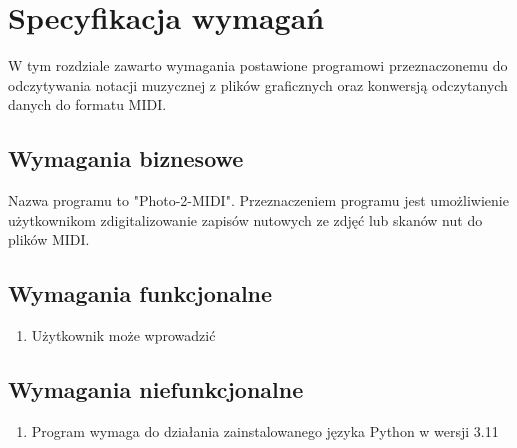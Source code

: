 \chapter{Specyfikacja wymagań}
W tym rozdziale zawarto wymagania postawione programowi przeznaczonemu do odczytywania notacji muzycznej z plików graficznych oraz konwersją odczytanych danych do formatu MIDI.

\section{Wymagania biznesowe}
Nazwa programu to "Photo-2-MIDI". Przeznaczeniem programu jest umożliwienie użytkownikom zdigitalizowanie zapisów nutowych ze zdjęć lub skanów nut do plików MIDI.

\section{Wymagania funkcjonalne}
	\begin{enumerate}
		\item Użytkownik może wprowadzić 
	\end{enumerate}
	
	
\section{Wymagania niefunkcjonalne}

	\begin{enumerate}
		\item Program wymaga do działania zainstalowanego języka Python w wersji 3.11
	\end{enumerate}